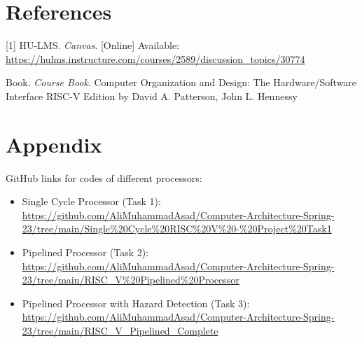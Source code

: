 \documentclass{report}
\theoremstyle{mytheoremstyle}
\theoremstyle{mytheoremstyle}
\theoremstyle{myproblemstyle}
\begin{document}
\chapter{References}

[1] HU-LMS. \textit{Canvas}. [Online] Available: \url{https://hulms.instructure.com/courses/2589/discussion_topics/30774}

\noindent[2] Book. \textit{Course Book}. Computer Organization and Design: The Hardware/Software Interface RISC-V Edition by David A. Patterson, John L. Hennessy

\appendix
\chapter{Appendix}

GitHub links for codes of different processors: 
\begin{itemize}
    \item Single Cycle Processor (Task 1): \url{https://github.com/AliMuhammadAsad/Computer-Architecture-Spring-23/tree/main/Single%20Cycle%20RISC%20V%20-%20Project%20Task1}
    \item Pipelined Processor (Task 2): \url{https://github.com/AliMuhammadAsad/Computer-Architecture-Spring-23/tree/main/RISC_V%20Pipelined%20Processor}
    \item Pipelined Processor with Hazard Detection (Task 3): \url{https://github.com/AliMuhammadAsad/Computer-Architecture-Spring-23/tree/main/RISC_V_Pipelined_Complete}
\end{itemize}
\end{document}
